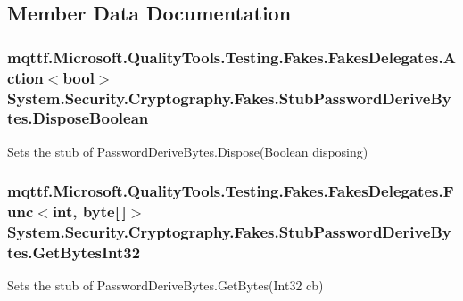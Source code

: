 \subsection{Member Data Documentation}
\hypertarget{class_system_1_1_security_1_1_cryptography_1_1_fakes_1_1_stub_password_derive_bytes_aa5f753385c93e398460fa6b82336dddb}{
\subsubsection[{Dispose\-Boolean}]{\setlength{\rightskip}{0pt plus 5cm}mqttf.\-Microsoft.\-Quality\-Tools.\-Testing.\-Fakes.\-Fakes\-Delegates.\-Action$<$bool$>$ System.\-Security.\-Cryptography.\-Fakes.\-Stub\-Password\-Derive\-Bytes.\-Dispose\-Boolean}}\label{class_system_1_1_security_1_1_cryptography_1_1_fakes_1_1_stub_password_derive_bytes_aa5f753385c93e398460fa6b82336dddb}


Sets the stub of Password\-Derive\-Bytes.\-Dispose(\-Boolean disposing)

\hypertarget{class_system_1_1_security_1_1_cryptography_1_1_fakes_1_1_stub_password_derive_bytes_a7bf2c47535b13808adc732d10783fcf9}{
\subsubsection[{Get\-Bytes\-Int32}]{\setlength{\rightskip}{0pt plus 5cm}mqttf.\-Microsoft.\-Quality\-Tools.\-Testing.\-Fakes.\-Fakes\-Delegates.\-Func$<$int, byte\mbox{[}$\,$\mbox{]}$>$ System.\-Security.\-Cryptography.\-Fakes.\-Stub\-Password\-Derive\-Bytes.\-Get\-Bytes\-Int32}}\label{class_system_1_1_security_1_1_cryptography_1_1_fakes_1_1_stub_password_derive_bytes_a7bf2c47535b13808adc732d10783fcf9}


Sets the stub of Password\-Derive\-Bytes.\-Get\-Bytes(\-Int32 cb)


